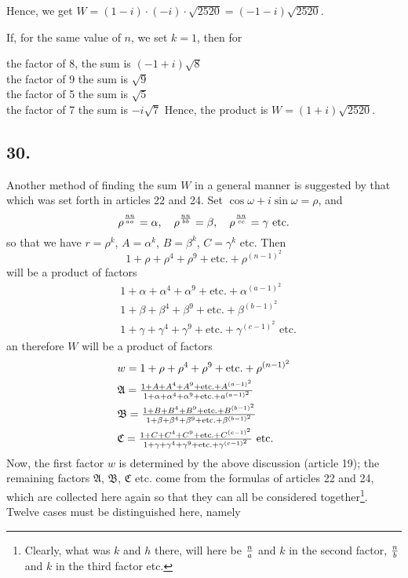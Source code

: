 \documentclass[twoside,12pt]{memoir}
\renewenvironment{quote}%
  {\list{}{\leftmargin=5em\rightmargin=0em}\item[]}%
  {\endlist}
\let\oldfrac\frac
\def\frac#1#2{\mathchoice{\tfrac{#1}{#2}}{\oldfrac{#1}{#2}}{\genfrac{}{}{}{2}{#1}{#2\mathstrut}}{\genfrac{}{}{}{3}{#1}{#2\mathstrut}}}
\begin{document}
Hence, we get \(W=(1-i) \cdot(-i) \cdot \sqrt{2520}=(-1-i) \sqrt{2520}\).
%

If, for the same value of \(n \), we set \(k = 1 \), then for
\begin{quote}
the factor of 8, the sum is \((-1+i) \sqrt{8}\)\\
the factor of 9 the sum is \(\sqrt{9}\)\\
the factor of 5 the sum is \(\sqrt{5}\)\\
the factor of 7 the sum is \(-i \sqrt{7}\)
\end{quote}
Hence, the product is \(W = (1+i) \sqrt{2520}\).
%

\subsection*{30.}
 
Another method of finding the sum \(W\) in a general manner is suggested by that which was set forth in articles 22 and 24. Set \(\cos \omega+i \sin \omega=\rho\), and
\[\rho^{\frac{n n}{a a}}=\alpha, \quad \rho^{\frac{n n}{b b}}=\beta, \quad \rho^{\frac{n n}{c c}}=\gamma \text{ etc{.}}\]
so that we have \(r=\rho^{k}\), \(A=\alpha^{k}\), \(B=\beta^{k}\), \(C=\gamma^{k}\) etc{.} Then
\[1+\rho+\rho^{4}+\rho^{9}+\text{etc{.}}+\rho^{(n-1)^{2}}\]
will be a product of factors
\[\begin{aligned}
& 1+\alpha+\alpha^{4}+\alpha^{9}+\text{etc{.}}+\alpha^{(a-1)^{2}} \\
& 1+\beta+\beta^{4}+\beta^{9}+\text{etc{.}}+\beta^{(b-1)^{2}} \\
& 1+\gamma+\gamma^{4}+\gamma^{9}+\text{etc{.}}+\gamma^{(c-1)^{2}} \text{ etc{.}}
\end{aligned}\]
an therefore \(W\) will be a product of factors
\[\begin{aligned}
& w=1+\rho+\rho^{4}+\rho^{9}+\text{etc{.}}+\rho^{(n-1)^{2}} \\
& \mathfrak{A}=\frac{1+A+A^{4}+A^{9}+\text{etc{.}}+A^{(a-1)^{2}}}{1+\alpha+\alpha^{4}+\alpha^{9}+\text{etc{.}}+a^{(a-1)^{2}}} \\
& \mathfrak{B}=\frac{1+B+B^{4}+B^{9}+\text{etc{.}}+B^{(b-1)^{2}}}{1+\beta+\beta^{4}+\beta^{9}+\text{etc{.}}+\beta^{(b-1)^2}} \\
& \mathfrak{C}=\frac{1+C+C^{4}+C^{9}+\text{etc{.}}+C^{(c-1)^{2}}}{1+\gamma+\gamma^{4}+\gamma^{9}+\text{etc{.}}+\gamma^{(c-1)^{2}}} \text{ etc{.}}
\end{aligned}\]
Now, the first factor \(w\) is determined by the above discussion (article 19); the remaining factors \(\mathfrak{A}\), \(\mathfrak{B}\), \(\mathfrak{C}\) etc{.} come from the formulas of articles 22 and 24, which are collected here again so that they can all be considered together\footnote{Clearly, what was \(k\) and \(h\) there, will here be \(\frac{n}{a}\) and \(k\) in the second factor, \(\frac{n}{b}\) and \(k\) in the third factor etc{.}}. Twelve cases must be distinguished here, namely\\
 
\end{document}
